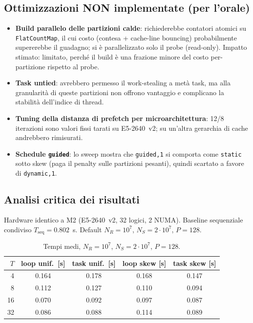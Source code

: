 \documentclass[11pt,a4paper]{article}
\theoremstyle{remark}
\begin{document}
\subsection{Ottimizzazioni NON implementate (per l'orale)}

\begin{itemize}
  \item \textbf{Build parallelo delle partizioni calde}: richiederebbe contatori atomici su \texttt{FlatCountMap}, il cui costo (contesa + cache-line bouncing) probabilmente supererebbe il guadagno; si \`e parallelizzato solo il probe (read-only). Impatto stimato: limitato, perch\'e il build \`e una frazione minore del costo per-partizione rispetto al probe.
  \item \textbf{Task untied}: avrebbero permesso il work-stealing a met\`a task, ma alla granularit\`a di queste partizioni non offrono vantaggio e complicano la stabilit\`a dell'indice di thread.
  \item \textbf{Tuning della distanza di prefetch per microarchitettura}: 12/8 iterazioni sono valori fissi tarati su E5-2640~v2; su un'altra gerarchia di cache andrebbero rimisurati.
  \item \textbf{Schedule \texttt{guided}}: lo sweep mostra che \texttt{guided,1} si comporta come \texttt{static} sotto skew (paga il penalty sulle partizioni pesanti), quindi scartato a favore di \texttt{dynamic,1}.
\end{itemize}

\subsection{Analisi critica dei risultati}

Hardware identico a M2 (E5-2640~v2, 32 logici, 2 NUMA). Baseline sequenziale condiviso $T_\text{seq}=0.802$~s. Default $N_R=10^7$, $N_S=2{\cdot}10^7$, $P=128$.

\begin{table}[H]
\centering\small
\begin{tabular}{@{}rcccc@{}}
\toprule
$T$ & loop unif.\ [s] & task unif.\ [s] & loop skew [s] & task skew [s] \\
\midrule
4  & 0.164 & 0.178 & 0.168 & 0.147 \\
8  & 0.112 & 0.127 & 0.110 & 0.094 \\
16 & 0.070 & 0.092 & 0.097 & 0.087 \\
32 & 0.086 & 0.088 & 0.114 & 0.089 \\
\bottomrule
\end{tabular}
\caption{Tempi medi, $N_R{=}10^7$, $N_S{=}2{\cdot}10^7$, $P{=}128$.}
\label{tab:m3strong}
\end{table}
\end{document}
